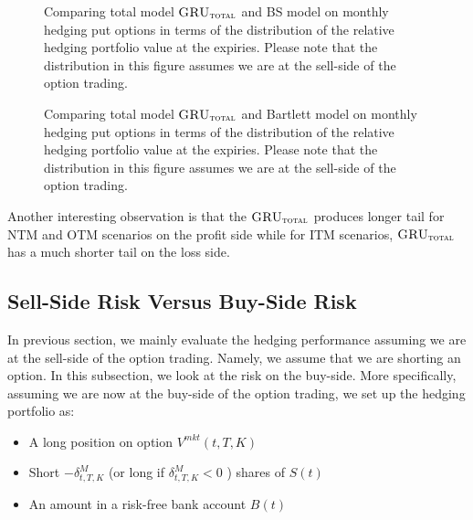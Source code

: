 \documentclass[letterpaper,12pt,titlepage,oneside,final]{book}
\numberwithin{equation}{section}
\theoremstyle{definition}
\newcommand{\modelT}{\textsc{GRU}_{\textsc{total}}}
\newcommand{\Vmkt}{V^{mkt}}
\newcommand{\Smkt}{S}
\begin{document}
\begin{figure}[htp!]
		\caption{Comparing total model $\modelT$ and BS model on monthly hedging put options in terms of the distribution of the  relative hedging portfolio value at the expiries. Please note that the distribution in this figure assumes we are at the sell-side of the option trading.}  \label{fig:putTotalM2}
	\centering
		\caption{Comparing total model $\modelT$ and Bartlett model on monthly hedging put options in terms of the distribution of the  relative hedging portfolio value at the expiries. Please note that the distribution in this figure assumes we are at the sell-side of the option trading.} \label{fig:putTotalM3}
\end{figure}
Another interesting observation is that the $\modelT$ produces longer tail for NTM and OTM scenarios on the profit side while for ITM scenarios, $\modelT$  has a much shorter tail on the loss side.


\subsection{Sell-Side Risk Versus Buy-Side Risk}
In previous section, we mainly evaluate the hedging performance assuming we are at the sell-side of the option trading. Namely, we assume that we are shorting an option. In this subsection, we look at the risk on the buy-side.  More specifically, assuming we are now at the buy-side of the option trading, we set up the hedging portfolio as:
\begin{itemize}
	\item A long position on option $\Vmkt(t,T,K)$
	\item Short $-\delta^{M}_{t,T,K}$ (or long if $\delta^{M}_{t,T,K}<0$ ) shares of $\Smkt(t)$
	\item An amount in a risk-free bank account $B(t)$
\end{itemize}
\end{document}
